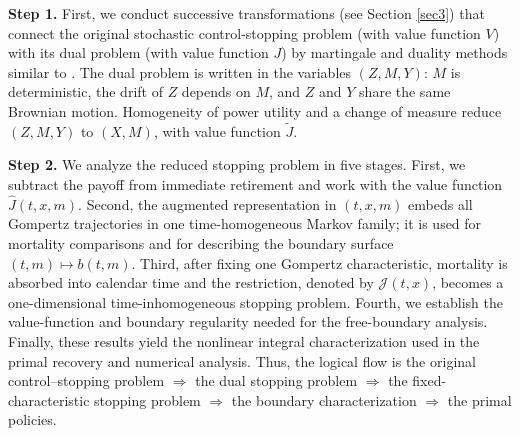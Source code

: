 \documentclass[a4paper,11pt]{amsart}
\numberwithin{equation}{section}
\newcommand{\blue}[1]{{\color{black}#1}}
\begin{document}
\textbf{Step 1.} {First, we conduct successive transformations (see Section \ref{sec3}) that connect the original stochastic control-stopping problem (with value function $V$) with its dual problem (with value function $J$) by martingale and duality methods similar to \citet{karatzas2000utility}. The dual problem is written in the variables $(Z,M,Y)$: $M$ is deterministic, the drift of $Z$ depends on $M$, and $Z$ and $Y$ share the same Brownian motion. Homogeneity of power utility and a change of measure reduce $(Z,M,Y)$ to $(X,M)$, with value function $\widetilde J$.}

\textbf{Step 2.} {We analyze the reduced stopping problem in five stages. First, we subtract the payoff from immediate retirement and work with the value function $\widehat J(t,x,m)$. Second, the augmented representation in $(t,x,m)$ embeds all Gompertz trajectories in one time-homogeneous Markov family; it is used for mortality comparisons and for describing the boundary surface $(t,m)\mapsto b(t,m)$. Third, after fixing one Gompertz characteristic, mortality is absorbed into calendar time and the restriction, denoted by $\mathcal J(t,x)$, becomes a one-dimensional time-inhomogeneous stopping problem. Fourth, we establish the value-function and boundary regularity needed for the free-boundary analysis. Finally, these results yield the nonlinear integral characterization used in the primal recovery and numerical analysis. Thus, the logical flow is the original control--stopping problem $\Longrightarrow$ the dual stopping problem $\Longrightarrow$ the fixed-characteristic stopping problem $\Longrightarrow$ the boundary characterization $\Longrightarrow$ the primal policies.}

\end{document}
